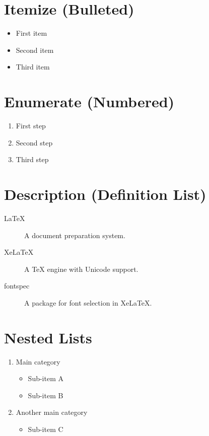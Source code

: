 \documentclass[12pt, a4paper]{article}
\begin{document}
\section*{Itemize (Bulleted)}
\begin{itemize}
  \item First item
  \item Second item
  \item Third item
\end{itemize}

\section*{Enumerate (Numbered)}
\begin{enumerate}
  \item First step
  \item Second step
  \item Third step
\end{enumerate}

\section*{Description (Definition List)}
\begin{description}
  \item[LaTeX] A document preparation system.
  \item[XeLaTeX] A TeX engine with Unicode support.
  \item[fontspec] A package for font selection in XeLaTeX.
\end{description}

\section*{Nested Lists}
\begin{enumerate}
  \item Main category
    \begin{itemize}
      \item Sub-item A
      \item Sub-item B
    \end{itemize}
  \item Another main category
    \begin{itemize}
      \item Sub-item C
    \end{itemize}
\end{enumerate}
\end{document}
